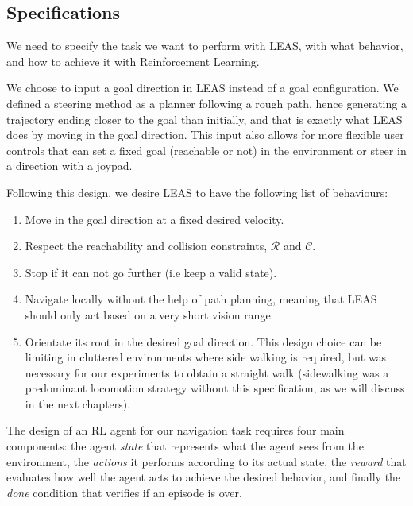 \subsection{Specifications \label{subsubsec:specifications}}
We need to specify the task we want to perform with LEAS, with what behavior, and how to achieve it with Reinforcement Learning.

We choose to input a goal direction in LEAS instead of a goal configuration.
We defined a steering method as a planner following a rough path, hence generating a trajectory ending closer to the goal than initially, and that is exactly what LEAS does by moving in the goal direction.
This input also allows for more flexible user controls that can set a fixed goal (reachable or not) in the environment or steer in a direction with a joypad.

Following this design, we desire LEAS to have the following list of behaviours:
\begin{enumerate}[label=(\Alph*)]
  \item Move in the goal direction at a fixed desired velocity.
  \item Respect the reachability and collision constraints, $\mathcal{R}$ and $\mathcal{C}$. 
  \item Stop if it can not go further (i.e keep a valid state).
  \item Navigate locally without the help of path planning, meaning that LEAS should only act based on a very short vision range.
  \item Orientate its root in the desired goal direction. This design choice can be limiting in cluttered environments where side walking is required, but was necessary for our experiments to obtain a straight walk (sidewalking was a predominant locomotion strategy without this specification, as we will discuss in the next chapters).
\label{list:leas:specifications}
\end{enumerate}

The design of an RL agent for our navigation task requires four main components: 
the agent \textit{state} that represents what the agent sees from the environment, the \textit{actions} it performs according to its actual state, the \textit{reward} that evaluates how well the agent acts to achieve the desired behavior, and finally the \textit{done} condition that verifies if an episode is over.

